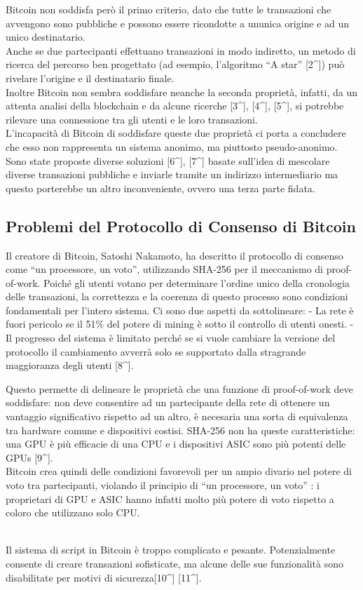 Bitcoin non soddisfa però il primo criterio, dato che tutte le
transazioni che avvengono sono pubbliche e possono essere ricondotte a
un\textquotesingle unica origine e ad un unico destinatario.\\
Anche se due partecipanti effettuano transazioni in modo indiretto, un
metodo di ricerca del percorso ben progettato (ad esempio, l'algoritmo
``A star'' {[}2\^{}{]}) può rivelare l'origine e il destinatario
finale.\\
Inoltre Bitcoin non sembra soddisfare neanche la seconda proprietà,
infatti, da un attenta analisi della blockchain e da alcune ricerche
{[}3\^{}{]}, {[}4\^{}{]}, {[}5\^{}{]}, si potrebbe rilevare una
connessione tra gli utenti e le loro transazioni.\\
L'incapacità di Bitcoin di soddisfare queste due proprietà ci porta a
concludere che esso non rappresenta un sistema anonimo, ma piuttosto
pseudo-anonimo. Sono state proposte diverse soluzioni {[}6\^{}{]},
{[}7\^{}{]} basate sull'idea di mescolare diverse transazioni pubbliche
e inviarle tramite un indirizzo intermediario ma questo porterebbe un
altro inconveniente, ovvero una terza parte fidata.

\subsection{Problemi del Protocollo di Consenso di
Bitcoin}\label{problemi-del-protocollo-di-consenso-di-bitcoin}

Il creatore di Bitcoin, Satoshi Nakamoto, ha descritto il protocollo di
consenso come ``un processore, un voto'', utilizzando SHA-256 per il
meccanismo di proof-of-work. Poiché gli utenti votano per determinare
l'ordine unico della cronologia delle transazioni, la correttezza e la
coerenza di questo processo sono condizioni fondamentali per l'intero
sistema. Ci sono due aspetti da sottolineare: - La rete è fuori pericolo
se il 51\% del potere di mining è sotto il controllo di utenti onesti. -
Il progresso del sistema è limitato perché se si vuole cambiare la
versione del protocollo il cambiamento avverrà solo se supportato dalla
stragrande maggioranza degli utenti {[}8\^{}{]}.

Questo permette di delineare le proprietà che una funzione di
proof-of-work deve soddisfare: non deve consentire ad un partecipante
della rete di ottenere un vantaggio significativo rispetto ad un altro,
è necesaria una sorta di equivalenza tra hardware comune e dispositivi
costisi. SHA-256 non ha queste caratteristiche: una GPU è più efficacie
di una CPU e i dispositivi ASIC sono più potenti delle GPUs
{[}9\^{}{]}.\\
Bitcoin crea quindi delle condizioni favorevoli per un ampio divario nel
potere di voto tra partecipanti, violando il principio di ``un
processore, un voto'' : i proprietari di GPU e ASIC hanno infatti molto
più potere di voto rispetto a coloro che utilizzano solo CPU.\\
\strut \\
Il sistema di script in Bitcoin è troppo complicato e pesante.
Potenzialmente consente di creare transazioni sofisticate, ma alcune
delle sue funzionalità sono disabilitate per motivi di
sicurezza{[}10\^{}{]} {[}11\^{}{]}.

